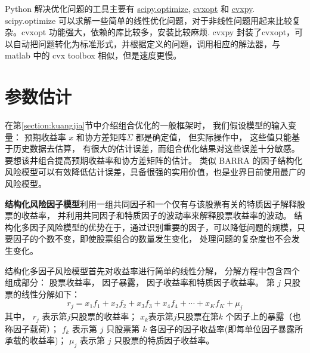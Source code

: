 \documentclass[UTF8,11pt]{ctexart}
\begin{document}
%

Python 解决优化问题的工具主要有 \href{https://docs.scipy.org/doc/scipy/reference/tutorial/optimize.html}{scipy.optimize}, \href{https://cvxopt.org/userguide/intro.html}{cvxopt} 和 \href{http://www.cvxpy.org/}{cvxpy}. scipy.optimize 可以求解一些简单的线性优化问题，对于非线性问题用起来比较复杂。cvxopt 功能强大，依赖的库比较多，安装比较麻烦. cvxpy 封装了cvxopt，可以自动把问题转化为标准形式，并根据定义的问题，调用相应的解法器，与 matlab 中的 cvx toolbox 相似，但是速度更慢。


\section{参数估计}
在第\ref{section:kuangjia}节中介绍组合优化的一般框架时， 我们假设模型的输入变量： 预期收益率 $x$ 和协方差矩阵$\Sigma$ 都是确定值， 但实际操作中， 这些值只能基于历史数据去估算， 有很大的估计误差，而组合优化结果对这些误差十分敏感。 要想该井组合提高预期收益率和协方差矩阵的估计。 类似 BARRA 的因子结构化风险模型可以有效降低估计误差，具备很强的实用价值，也是业界目前使用最广的风险模型。

\textbf{结构化风险因子模型}利用一组共同因子和一个仅有与该股票有关的特质因子解释股票的收益率， 并利用共同因子和特质因子的波动率来解释股票收益率的波动。 结构化多因子风险模型的优势在于，通过识别重要的因子，可以降低问题的规模，只要因子的个数不变，即使股票组合的数量发生变化， 处理问题的复杂度也不会发生变化。

结构化多因子风险模型首先对收益率进行简单的线性分解， 分解方程中包含四个组成部分： 股票收益率， 因子暴露， 因子收益率和特质因子收益率。 第 $j$ 只股票的线性分解如下：
\begin{equation}
r_j=x_1f_1+x_2f_2+x_3f_3+x_4f_4+\cdots+x_Kf_K+\mu_j
\end{equation}
其中， $r_j$ 表示第$j$只股票的收益率； $x_k$表示第$j$只股票在第$k$ 个因子上的暴露（也称因子载荷）； $f_k$ 表示第 $j$ 只股票第 $k$ 各因子的因子收益率(即每单位因子暴露所承载的收益率)； $\mu_j$ 表示第 $j$ 只股票的特质因子收益率。
\end{document}
